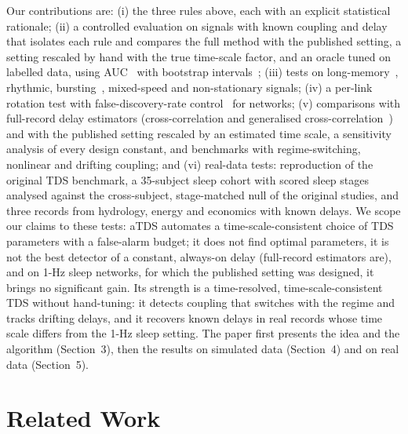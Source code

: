 \documentclass[11pt,a4paper]{article}
\begin{document}
Our contributions are: (i) the three rules above, each with an explicit statistical rationale; (ii) a controlled evaluation on signals with known coupling and delay that isolates each rule and compares the full method with the published setting, a setting rescaled by hand with the true time-scale factor, and an oracle tuned on labelled data, using AUC~\cite{Hanley1982MeaningUse} with bootstrap intervals~\cite{Efron1979BootstrapMethods}; (iii) tests on long-memory~\cite{Davies1987TestsHurst,Peng1995QuantificationScaling}, rhythmic, bursting~\cite{Rulkov2002ModelingSpikingbursting}, mixed-speed and non-stationary signals; (iv) a per-link rotation test with false-discovery-rate control~\cite{Benjamini1995ControllingFalse} for networks; (v) comparisons with full-record delay estimators (cross-correlation and generalised cross-correlation~\cite{Knapp1976GeneralizedCorrelation,Carter1987CoherenceTime}) and with the published setting rescaled by an estimated time scale, a sensitivity analysis of every design constant, and benchmarks with regime-switching, nonlinear and drifting coupling; and (vi) real-data tests: reproduction of the original TDS benchmark, a 35-subject sleep cohort with scored sleep stages analysed against the cross-subject, stage-matched null of the original studies, and three records from hydrology, energy and economics with known delays. We scope our claims to these tests: aTDS automates a time-scale-consistent choice of TDS parameters with a false-alarm budget; it does not find optimal parameters, it is not the best detector of a constant, always-on delay (full-record estimators are), and on 1-Hz sleep networks, for which the published setting was designed, it brings no significant gain. Its strength is a time-resolved, time-scale-consistent TDS without hand-tuning: it detects coupling that switches with the regime and tracks drifting delays, and it recovers known delays in real records whose time scale differs from the 1-Hz sleep setting. The paper first presents the idea and the algorithm (Section~3), then the results on simulated data (Section~4) and on real data (Section~5).

\section{Related Work}
\label{sec:related_work}
\end{document}
